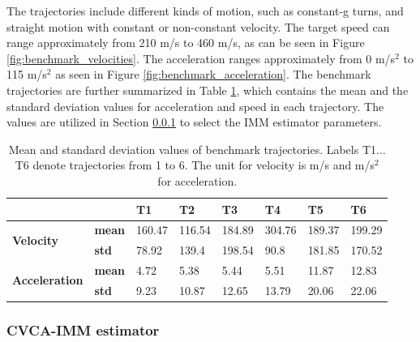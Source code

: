 \documentclass[english, 12pt, a4paper, elec, utf8, a-1b, online]{aaltothesis}
\numberwithin{equation}{section}
\begin{document}
The trajectories include different kinds of motion, such as constant-g turns, and straight motion with constant or non-constant velocity.
The target speed can range approximately from 210 m/s to 460 m/s, as can be seen in Figure \ref{fig:benchmark_velocities}.
The acceleration ranges approximately from 0 m/s$^2$ to 115 m/s$^2$ as seen in Figure \ref{fig:benchmark_acceleration}.
The benchmark trajectories are further summarized in Table \ref{tab:benchmark_table}, which contains the mean and the standard deviation values for acceleration and speed in each trajectory.
The values are utilized in Section \ref{sec:cvca_imm} to select the IMM estimator parameters. 


\begin{table}[htb]
    \centering
\begin{tabular}{|l|l|l|l|l|l|l|l|}
\hline
\multicolumn{2}{|l|}{}                                 & \textbf{T1} & \textbf{T2} & \textbf{T3} & \textbf{T4} & \textbf{T5} & \textbf{T6} \\ \hline
\multirow{2}{*}{\textbf{Velocity}}     & \textbf{mean} & 160.47      & 116.54      & 184.89      & 304.76      & 189.37      & 199.29      \\ \cline{2-8} 
                                       & \textbf{std}  & 78.92       & 139.4       & 198.54      & 90.8        & 181.85      & 170.52      \\ \hline
\multirow{2}{*}{\textbf{Acceleration}} & \textbf{mean} & 4.72        & 5.38        & 5.44        & 5.51        & 11.87       & 12.83       \\ \cline{2-8} 
                                       & \textbf{std}  & 9.23        & 10.87       & 12.65       & 13.79       & 20.06       & 22.06       \\ \hline
\end{tabular}
    \caption{Mean and standard deviation values of benchmark trajectories. Labels T1$\ldots$T6 denote trajectories from 1 to 6. The unit for velocity is m/s and m/s$^2$ for acceleration.}
    \label{tab:benchmark_table}
\end{table}


\subsubsection{CVCA-IMM estimator}\label{sec:cvca_imm}
\end{document}
